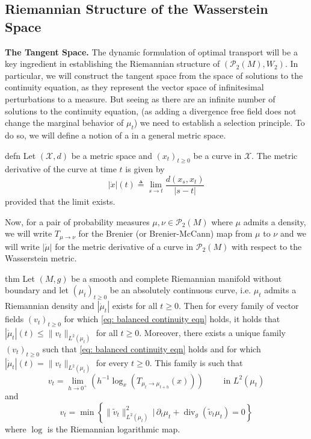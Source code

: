 \documentclass[11pt]{article}
\newcommand{\man}{M}
\begin{document}
\subsection{Riemannian Structure of the Wasserstein Space}

\noindent \textbf{The Tangent Space.} The dynamic formulation of optimal transport will be a key ingredient in establishing the Riemannian structure of $(\mathcal{P}_2(\man), W_2)$. In particular, we will construct the tangent space from the space of solutions to the continuity equation, as they represent the vector space of infinitesimal perturbations to a measure. But seeing as there are an infinite number of solutions to the continuity equation, (as adding a divergence free field does not change the marginal behavior of $\mu_t$) we need to establish a selection principle. To do so, we will define a notion of a  in a general metric space.

\begin{restatable}{defn}{}
    Let $(\mathcal{X}, d)$ be a metric space and $(x_t)_{t \geq 0}$ be a curve in $\mathcal{X}$. The metric derivative of the curve at time $t$ is given by
    \begin{equation*}
        |\dot x|(t) \triangleq \lim_{s\rightarrow t}\frac{d(x_s, x_t)}{|s - t|}
    \end{equation*}
    provided that the limit exists. 
\end{restatable}

Now, for a pair of probability measures $\mu, \nu \in \mathcal{P}_{2}(\man)$ where $\mu$ admits a density, we will write $T_{\mu \rightarrow \nu}$ for the Brenier (or Brenier-McCann) map from $\mu$ to $\nu$ and we will write $|\dot \mu|$ for the metric derivative of a curve in $\mathcal{P}_{2}(\man)$ with respect to the Wasserstein metric.

\begin{restatable}{thm}{}
    Let $(M, g)$ be a smooth and complete Riemannian manifold without boundary and let $(\mu_t)_{t\geq 0}$ be an absolutely continuous curve, i.e. $\mu_t$ admits a Riemannian density and $|\dot \mu_t|$ exists for all $t \geq 0$. Then for every family of vector fields $(v_t)_{t\geq 0}$ for which \cref{eq: balanced continuity eqn} holds, it holds that $|\dot \mu_t|(t) \leq \|v_t\|_{L^2(\mu_t)}$ for all $t \geq 0$. Moreover, there exists a unique family $(v_t)_{t\geq 0}$ such that \cref{eq: balanced continuity eqn} holds and for which $|\dot \mu_t|(t) = \|v_t\|_{L^2(\mu_t)}$ for every $t \geq 0$. This family is such that
    \begin{equation*}
        v_t = \lim_{h \rightarrow0^+}\left(h^{-1}\log_x(T_{\mu_t\rightarrow \mu_{t+h}}(x))\right) \qquad \text{ in $L^2(\mu_t)$}
    \end{equation*}
    and
    \begin{equation*}
        v_t = \min \left\{\|\tilde{v}_t\|_{L^2(\mu_t)}^2 \, \Big|\, \partial_t\mu_t + \operatorname{div}_g(\tilde v_t\mu_t) = 0\right\}
    \end{equation*}
    where $\log$ is the Riemannian logarithmic map. 
\end{restatable}
\end{document}
